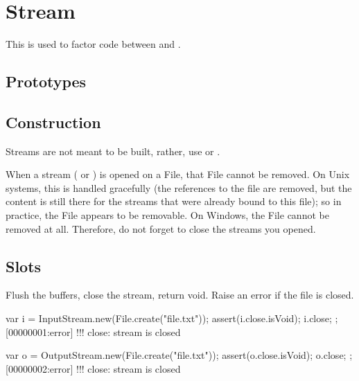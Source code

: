 
\section{Stream}

This is used to factor code between  and
.

\subsection{Prototypes}
\begin{refObjects}
\item[Object]
\end{refObjects}

\subsection{Construction}
\label{sec:specs:Stream:ctor}

Streams are not meant to be built, rather, use  or
.

When a stream ( or ) is
opened on a File, that File cannot be removed.  On Unix systems, this is
handled gracefully (the references to the file are removed, but the content
is still there for the streams that were already bound to this file); so in
practice, the File appears to be removable.  On Windows, the File cannot be
removed at all.  Therefore, do not forget to close the streams you opened.

\subsection{Slots}

\begin{urbiscriptapi}
\item[close] Flush the buffers, close the stream, return void.  Raise an
  error if the file is closed.
\begin{urbiscript}
{
  var i = InputStream.new(File.create("file.txt"));
  assert(i.close.isVoid);
  i.close;
};
[00000001:error] !!! close: stream is closed

{
  var o = OutputStream.new(File.create("file.txt"));
  assert(o.close.isVoid);
  o.close;
};
[00000002:error] !!! close: stream is closed
\end{urbiscript}
\end{urbiscriptapi}

